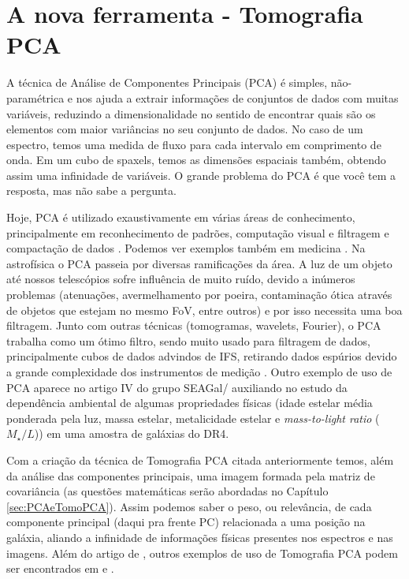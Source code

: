 \section{A nova ferramenta - Tomografia PCA}
\label{sec:Intro:TomoPCA}

A técnica de Análise de Componentes Principais (PCA) é simples, não-paramétrica
e nos ajuda a extrair informações de conjuntos de dados com muitas variáveis,
reduzindo a dimensionalidade no sentido de encontrar quais são os elementos com
maior variâncias no seu conjunto de dados. No caso de um espectro, temos uma
medida de fluxo para cada intervalo em comprimento de onda. Em um cubo de
spaxels, temos as dimensões espaciais também, obtendo assim uma infinidade de
variáveis. O grande problema do PCA é que você tem a resposta, mas não sabe a
pergunta.

Hoje, PCA é utilizado exaustivamente em várias áreas de conhecimento,
principalmente em reconhecimento de padrões, computação visual e filtragem e
compactação de dados \citep{Kamruzzaman2010, Borcea2012}. Podemos ver exemplos
também em medicina \citep{Balakrishnan2013}. Na astrofísica o PCA passeia por
diversas ramificações da área. A luz de um objeto até nossos telescópios sofre
influência de muito ruído, devido a inúmeros problemas (atenuações,
avermelhamento por poeira, contaminação ótica através de objetos que estejam no
mesmo FoV, entre outros) e por isso necessita uma boa filtragem. Junto com
outras técnicas (tomogramas, wavelets, Fourier), o PCA trabalha como um ótimo
filtro, sendo muito usado para filtragem de dados, principalmente cubos de dados
advindos de IFS, retirando dados espúrios devido a grande complexidade dos
instrumentos de medição \citep{Riffel2011}. Outro exemplo de uso de PCA aparece
no artigo IV do grupo SEAGal/\starlight \citep{Mateus2007} auxiliando no estudo
da dependência ambiental de algumas propriedades físicas (idade estelar média
ponderada pela luz, massa estelar, metalicidade estelar e {\em mass-to-light
ratio} ($M_\star / L$)) em uma amostra de galáxias do \SDSS DR4.
\citet{Chen2012}

Com a criação da técnica de Tomografia PCA citada anteriormente temos, além da
análise das componentes principais, uma imagem formada pela matriz de
covariância (as questões matemáticas serão abordadas no Capítulo
\ref{sec:PCAeTomoPCA}). Assim podemos saber o peso, ou relevância, de cada
componente principal (daqui pra frente PC) relacionada a uma posição na galáxia,
aliando a infinidade de informações físicas presentes nos espectros e nas
imagens. Além do artigo de \citet{Steiner2009}, outros exemplos de uso de
Tomografia PCA podem ser encontrados em \citet{Riffel2011} e \citet{Ricci2011}.


